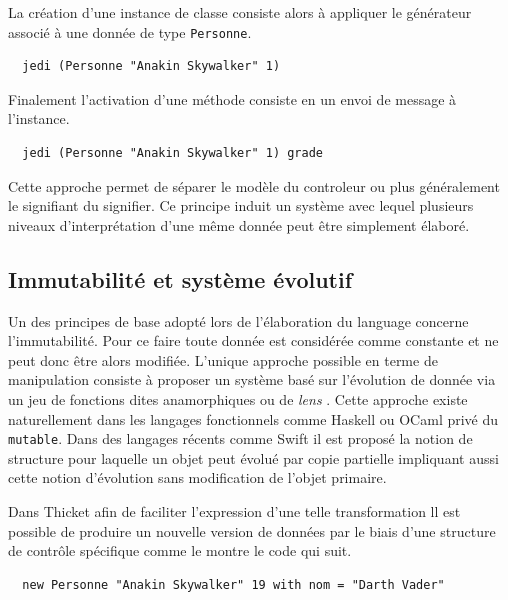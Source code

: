 \documentclass[twoside,a4paper]{article}
\begin{document}
La création  d'une instance  de classe consiste  alors à  appliquer le
générateur associé à une donnée de type {\tt Personne}.

\lstset{language=Thicket}
\begin{lstlisting}
  jedi (Personne "Anakin Skywalker" 1)
\end{lstlisting}

Finalement l'activation d'une méthode consiste  en un envoi de message
à l'instance.

\lstset{language=Thicket}
\begin{lstlisting}
  jedi (Personne "Anakin Skywalker" 1) grade
\end{lstlisting}

Cette  approche permet  de séparer  le modèle  du controleur  ou plus
généralement le signifiant du signifier. Ce principe induit un système
avec lequel  plusieurs niveaux d'interprétation d'une  même donnée peut
être simplement élaboré.


\subsection{Immutabilité et système évolutif}

Un  des principes  de base  adopté lors  de l'élaboration  du language
concerne  l'immutabilité. Pour  ce faire  toute donnée  est considérée
comme constante et ne peut donc être alors modifiée. L'unique approche
possible en terme de manipulation  consiste à proposer un système basé
sur l'évolution de donnée via  un jeu de fonctions dites anamorphiques
ou de  {\em lens} \cite{meijer1991functional}.  Cette  approche existe
naturellement dans  les langages  fonctionnels comme Haskell  ou OCaml
privé  du  {\tt  mutable}.   Dans des  langages  récents  comme  Swift
\cite{swift} il  est proposé la  notion de structure pour  laquelle un
objet peut  évolué par copie  partielle impliquant aussi  cette notion
d'évolution sans modification de l'objet primaire.

Dans Thicket afin de faciliter l'expression d'une telle transformation
ll est  possible de  produire un  nouvelle version  de données  par le
biais d'une structure  de contrôle spécifique comme le  montre le code
qui suit.

\lstset{language=Thicket}
\begin{lstlisting}
  new Personne "Anakin Skywalker" 19 with nom = "Darth Vader"
\end{lstlisting}
\end{document}
